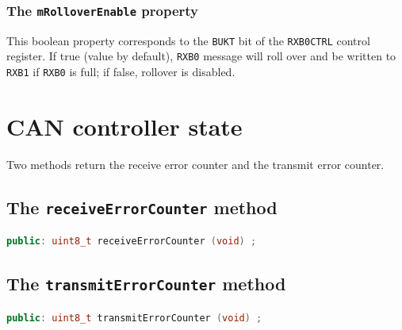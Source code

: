 \documentclass[10pt, a4paper, obeyspaces, openany]{extarticle}
\newcommand \sectionLabel[2]{\section{#1}\label{sec:#2}}
\newcommand \subsubsectionLabel[2]{\subsubsection{#1}\label{subsubsec:#2}}
\begin{document}
\subsubsectionLabel{The \texttt{mRolloverEnable} property}{mRolloverEnable}

This boolean property corresponds to the \texttt{BUKT} bit of the \texttt{RXB0CTRL} control register. If true (value by default), \texttt{RXB0} message will roll over and be written to \texttt{RXB1} if \texttt{RXB0} is full; if false, rollover is disabled.











\sectionLabel{CAN controller state}{canControllerState}

Two methods return the receive error counter and the transmit error counter.



\subsection{The \texttt{receiveErrorCounter} method}

{ \small\begin{lstlisting}[language=c++]
public: uint8_t receiveErrorCounter (void) ;
\end{lstlisting}}



\subsection{The \texttt{transmitErrorCounter} method}

{ \small\begin{lstlisting}[language=c++]
public: uint8_t transmitErrorCounter (void) ;
\end{lstlisting}}
\end{document}
